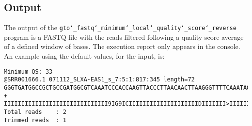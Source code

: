 \subsection*{Output}
The output of the \texttt{gto\char`_fastq\char`_minimum\char`_local\char`_quality\char`_score\char`_reverse} program is a FASTQ file with the reads filtered following a quality score average of a defined window of bases.
The execution report only appears in the console.\\
An example using the default values, for the input, is:
\begin{lstlisting}
Minimum QS: 33
@SRR001666.1 071112_SLXA-EAS1_s_7:5:1:817:345 length=72
GGGTGATGGCCGCTGCCGATGGCGTCAAATCCCACCAAGTTACCCTTAACAACTTAAGGGTTTTCAAATAGA
+
IIIIIIIIIIIIIIIIIIIIIIIIIIIIII9IG9ICIIIIIIIIIIIIIIIIIIIIDIIIIIII>IIIIII/
Total reads    : 2
Trimmed reads  : 1
\end{lstlisting}